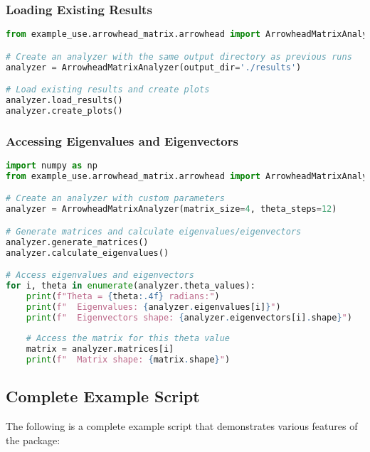\subsubsection{Loading Existing Results}

\begin{lstlisting}[language=Python]
from example_use.arrowhead_matrix.arrowhead import ArrowheadMatrixAnalyzer

# Create an analyzer with the same output directory as previous runs
analyzer = ArrowheadMatrixAnalyzer(output_dir='./results')

# Load existing results and create plots
analyzer.load_results()
analyzer.create_plots()
\end{lstlisting}

\subsubsection{Accessing Eigenvalues and Eigenvectors}

\begin{lstlisting}[language=Python]
import numpy as np
from example_use.arrowhead_matrix.arrowhead import ArrowheadMatrixAnalyzer

# Create an analyzer with custom parameters
analyzer = ArrowheadMatrixAnalyzer(matrix_size=4, theta_steps=12)

# Generate matrices and calculate eigenvalues/eigenvectors
analyzer.generate_matrices()
analyzer.calculate_eigenvalues()

# Access eigenvalues and eigenvectors
for i, theta in enumerate(analyzer.theta_values):
    print(f"Theta = {theta:.4f} radians:")
    print(f"  Eigenvalues: {analyzer.eigenvalues[i]}")
    print(f"  Eigenvectors shape: {analyzer.eigenvectors[i].shape}")
    
    # Access the matrix for this theta value
    matrix = analyzer.matrices[i]
    print(f"  Matrix shape: {matrix.shape}")
\end{lstlisting}

\subsection{Complete Example Script}

The following is a complete example script that demonstrates various features of the package:

